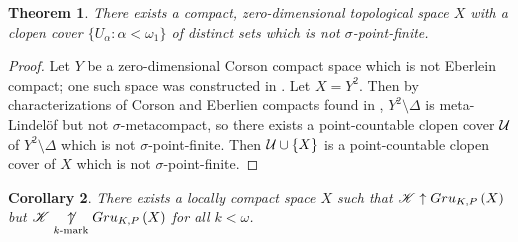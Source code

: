 \documentclass{amsart}
\newtheorem{theorem}{Theorem}[section]
\newtheorem{corollary}[theorem]{Corollary}
\theoremstyle{definition}
\begin{document}
\begin{theorem}
  There exists a compact, zero-dimensional topological space $X$
  with a clopen cover $\{U_\alpha : \alpha<\omega_1\}$ of distinct
  sets which is not $\sigma$-point-finite.
\end{theorem}

\begin{proof}
  Let $Y$ be a zero-dimensional Corson compact space which is not Eberlein
  compact; one such space was constructed in \cite{Marciszewski1991291}.
  Let $X=Y^2$.
  Then by characterizations of Corson and Eberlien compacts found in
  \cite{MR752278},
  $Y^2\setminus\Delta$ is meta-Lindel\"of but not $\sigma$-metacompact, so
  there exists a point-countable clopen cover $\mathcal{U}$ of $Y^2\setminus\Delta$
  which is not $\sigma$-point-finite. Then $\mathcal{U}\cup\{X\}$ is a point-countable
  clopen cover of $X$ which is not $\sigma$-point-finite.
\end{proof}

\begin{corollary}
  There exists a locally compact space $X$ such that $\mathscr{K}\uparrow Gru_{K,P}\left({X}\right)$
  but $\mathscr{K}\underset{k\text{-mark}}{\not\uparrow} Gru_{K,P}\left({X}\right)$ for all $k<\omega$.
\end{corollary}




\end{document}
